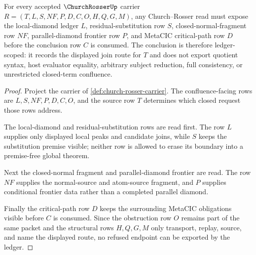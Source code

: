 \begin{theorem}
\label{thm:church-rosser-diamond-ledger}
For every accepted $\ChurchRosserUp$ carrier $R=(T,L,S,NF,P,D,C,O,H,Q,G,M)$, any Church--Rosser read must expose the local-diamond ledger $L$, residual-substitution row $S$, closed-normal-fragment row $NF$, parallel-diamond frontier row $P$, and MetaCIC critical-path row $D$ before the conclusion row $C$ is consumed. The conclusion is therefore ledger-scoped: it records the displayed join route for $T$ and does not export quotient syntax, host evaluator equality, arbitrary subject reduction, full consistency, or unrestricted closed-term confluence.
\end{theorem}
\begin{proof}
Project the carrier of \autoref{def:church-rosser-carrier}. The confluence-facing rows are $L,S,NF,P,D,C,O$, and the source row $T$ determines which closed request those rows address.

The local-diamond and residual-substitution rows are read first. The row $L$ supplies only displayed local peaks and candidate joins, while $S$ keeps the substitution premise visible; neither row is allowed to erase its boundary into a premise-free global theorem.

Next the closed-normal fragment and parallel-diamond frontier are read. The row $NF$ supplies the normal-source and atom-source fragment, and $P$ supplies conditional frontier data rather than a completed parallel diamond.

Finally the critical-path row $D$ keeps the surrounding MetaCIC obligations visible before $C$ is consumed. Since the obstruction row $O$ remains part of the same packet and the structural rows $H,Q,G,M$ only transport, replay, source, and name the displayed route, no refused endpoint can be exported by the ledger.
\end{proof}

